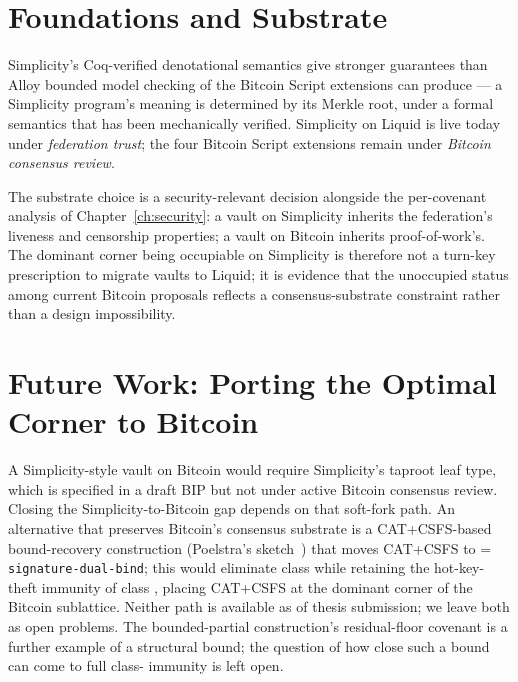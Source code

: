 \section{Foundations and Substrate}
\label{app:simplicity:foundations}

Simplicity's Coq-verified denotational semantics give stronger
guarantees than Alloy bounded model checking of the Bitcoin Script
extensions can produce --- a Simplicity program's meaning is
determined by its Merkle root, under a formal semantics that has
been mechanically verified. Simplicity on Liquid is live today under
\emph{federation trust}; the four Bitcoin Script extensions remain
under \emph{Bitcoin consensus review}.

The substrate choice is a security-relevant decision alongside the
per-covenant analysis of Chapter~\ref{ch:security}: a vault on
Simplicity inherits the federation's liveness and censorship
properties; a vault on Bitcoin inherits proof-of-work's. The
dominant corner being occupiable on Simplicity is therefore not a
turn-key prescription to migrate vaults to Liquid; it is evidence
that the unoccupied status among current Bitcoin proposals reflects a
consensus-substrate constraint rather than a design impossibility.

\section{Future Work: Porting the Optimal Corner to Bitcoin}
\label{app:simplicity:future}

A Simplicity-style vault on Bitcoin would require Simplicity's
taproot leaf type, which is specified in a draft BIP but not under
active Bitcoin consensus review. Closing the Simplicity-to-Bitcoin
gap depends on that soft-fork path. An alternative that preserves
Bitcoin's consensus substrate is a CAT+CSFS-based bound-recovery
construction (Poelstra's sketch~\cite{Poe21}) that moves CAT+CSFS
to \axrecbind{} = \texttt{signature-dual-bind}; this would eliminate
class \classcold{} while retaining the hot-key-theft immunity of
class \classhot{}, placing CAT+CSFS at the dominant corner of the
Bitcoin sublattice. Neither path is available as of thesis
submission; we leave both as open problems. The bounded-partial
construction's residual-floor covenant is a further example of a
structural bound; the question of how close such a bound can come to
full class-\classscale{} immunity is left open.
